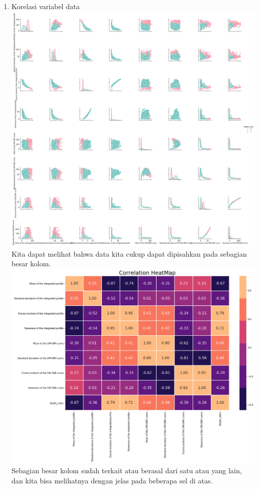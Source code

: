 \documentclass[12pt]{article}
\begin{document}
\begin{enumerate}
        \item Korelasi variabel data
        \newline \includegraphics[scale=0.24]{data-correlation.png}
        \newline Kita dapat melihat bahwa data kita cukup dapat dipisahkan pada sebagian besar kolom.
        \newline \includegraphics[scale=0.35]{data-correlation-2.png}
        \newline Sebagian besar kolom sudah terkait atau berasal dari satu atau yang lain, dan kita bisa melihatnya dengan jelas pada beberapa sel di atas.
        

\end{enumerate}
\end{document}

